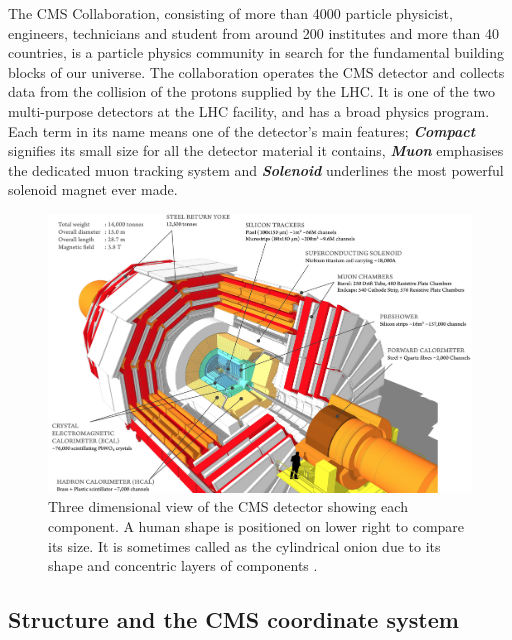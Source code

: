 The CMS Collaboration, consisting of more than 4000 particle physicist, engineers, technicians and student from around 200 institutes and more than 40 countries, is a  particle physics community in search for the fundamental building blocks of our universe. The collaboration operates the CMS detector and collects data from the collision of the protons supplied by the LHC. It is one of the two multi-purpose detectors at the LHC facility, and has a broad physics program. Each term in its name means one of the detector's main features; \textbf{\emph{Compact}} signifies its small size for all the detector material it contains, \textbf{\emph{Muon}} emphasises the dedicated muon tracking system and \textbf{\emph{Solenoid}} underlines the most powerful solenoid magnet ever made.

\begin{figure}[ht]
	\centering
	\includegraphics[width=\textwidth]{MSc_Thesis/fig/CMSdetector.png}
	\vspace{2mm}
	\caption[Three dimensional view of the CMS detector showing each component. A human shape is positioned on lower right to compare its size. It is sometimes called as the cylindrical onion due to its shape and concentric layers of components.]
	{Three dimensional view of the CMS detector showing each component. A human shape is positioned on lower right to compare its size. It is sometimes called as the cylindrical onion due to its shape and concentric layers of components \cite{CMSdetector}.}
	\label{CMSdetector}
\end{figure}

\subsection{Structure and the CMS coordinate system}

